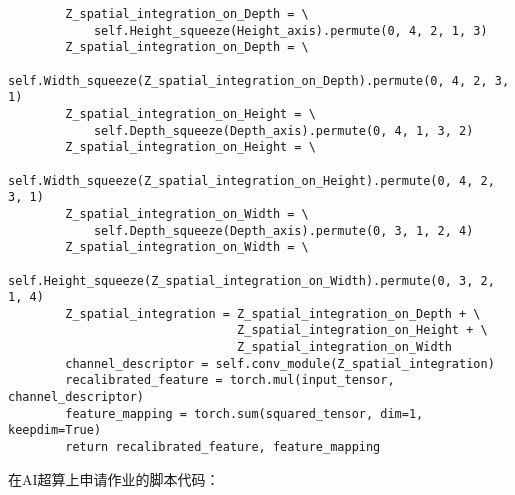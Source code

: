 \begin{lstlisting}
        Z_spatial_integration_on_Depth = \
            self.Height_squeeze(Height_axis).permute(0, 4, 2, 1, 3)
        Z_spatial_integration_on_Depth = \
            self.Width_squeeze(Z_spatial_integration_on_Depth).permute(0, 4, 2, 3, 1)
        Z_spatial_integration_on_Height = \
            self.Depth_squeeze(Depth_axis).permute(0, 4, 1, 3, 2)
        Z_spatial_integration_on_Height = \
            self.Width_squeeze(Z_spatial_integration_on_Height).permute(0, 4, 2, 3, 1)
        Z_spatial_integration_on_Width = \
            self.Depth_squeeze(Depth_axis).permute(0, 3, 1, 2, 4)
        Z_spatial_integration_on_Width = \
            self.Height_squeeze(Z_spatial_integration_on_Width).permute(0, 3, 2, 1, 4)
        Z_spatial_integration = Z_spatial_integration_on_Depth + \
                                Z_spatial_integration_on_Height + \
                                Z_spatial_integration_on_Width
        channel_descriptor = self.conv_module(Z_spatial_integration)
        recalibrated_feature = torch.mul(input_tensor, channel_descriptor)
        feature_mapping = torch.sum(squared_tensor, dim=1, keepdim=True)
        return recalibrated_feature, feature_mapping

\end{lstlisting}

在AI超算上申请作业的脚本代码：


